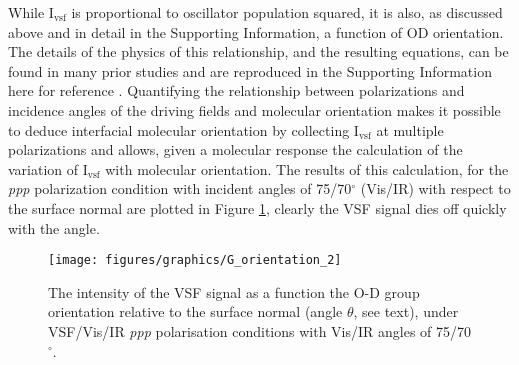 \documentclass[twoside,twocolumn,9pt]{article}
\begin{document}
While I$_{\text{vsf}}$ is proportional to oscillator population squared, it is also, as discussed above and in detail in the Supporting Information, a function of OD orientation. The details of the physics of this relationship, and the resulting equations, can be found in many prior studies and are reproduced in the Supporting Information here for reference \cite{zhu99,lam05}. Quantifying the relationship between polarizations and incidence angles of the driving fields and molecular orientation makes it possible to deduce interfacial molecular orientation by collecting I$_{\text{vsf}}$ at multiple polarizations and allows, given a molecular response the calculation of the variation of I$_{\text{vsf}}$ with molecular orientation. The results of this calculation, for the \textit{ppp} polarization condition with incident angles of 75/70$^{\circ}$ (Vis/IR) with respect to the surface normal are plotted in Figure \ref{G-orientation1}, clearly the VSF signal dies off quickly with the angle.
%
\begin{figure}
\begin{center} 
\texttt{[image: figures/graphics/G\_orientation\_2]}
\end{center} 
\caption{The intensity of the VSF signal as a function the O-D group orientation relative to the surface normal (angle $\theta$, see text), under VSF/Vis/IR \textit{ppp} polarisation conditions with  Vis/IR angles of 75/70$^{\circ}$.}
\label{G-orientation1}
\end{figure}
\end{document}

